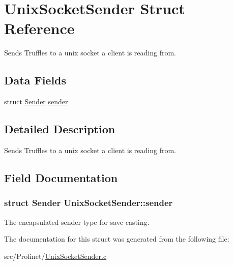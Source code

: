 \hypertarget{struct_unix_socket_sender}{}\section{Unix\+Socket\+Sender Struct Reference}
\label{struct_unix_socket_sender}


Sends Truffles to a unix socket a client is reading from.  


\subsection*{Data Fields}
\begin{DoxyCompactItemize}
\item 
struct \hyperlink{struct_sender}{Sender} \hyperlink{struct_unix_socket_sender_a24b3558900d7939b7e292003b9fe853d}{sender}
\end{DoxyCompactItemize}


\subsection{Detailed Description}
Sends Truffles to a unix socket a client is reading from. 

\subsection{Field Documentation}
\hypertarget{struct_unix_socket_sender_a24b3558900d7939b7e292003b9fe853d}{}
\subsubsection[{sender}]{\setlength{\rightskip}{0pt plus 5cm}struct {\bf Sender} Unix\+Socket\+Sender\+::sender}\label{struct_unix_socket_sender_a24b3558900d7939b7e292003b9fe853d}
The encapsulated sender type for save casting. 

The documentation for this struct was generated from the following file\+:\begin{DoxyCompactItemize}
\item 
src/\+Profinet/\hyperlink{_unix_socket_sender_8c}{Unix\+Socket\+Sender.\+c}\end{DoxyCompactItemize}
